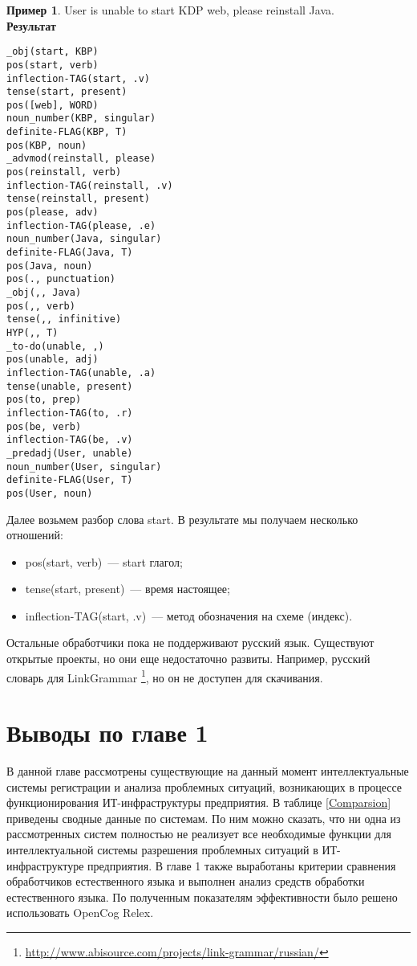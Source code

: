 \textbf{Пример 1}. User is unable to start KDP web, please reinstall Java.\\
\textbf{Результат} 
\begin{lstlisting}
_obj(start, KBP)
pos(start, verb)
inflection-TAG(start, .v)
tense(start, present)
pos([web], WORD)
noun_number(KBP, singular)
definite-FLAG(KBP, T)
pos(KBP, noun)
_advmod(reinstall, please)
pos(reinstall, verb)
inflection-TAG(reinstall, .v)
tense(reinstall, present)
pos(please, adv)
inflection-TAG(please, .e)
noun_number(Java, singular)
definite-FLAG(Java, T)
pos(Java, noun)
pos(., punctuation)
_obj(,, Java)
pos(,, verb)
tense(,, infinitive)
HYP(,, T)
_to-do(unable, ,)
pos(unable, adj)
inflection-TAG(unable, .a)
tense(unable, present)
pos(to, prep)
inflection-TAG(to, .r)
pos(be, verb)
inflection-TAG(be, .v)
_predadj(User, unable)
noun_number(User, singular)
definite-FLAG(User, T)
pos(User, noun)
\end{lstlisting}




Далее возьмем разбор слова start. В результате мы получаем несколько отношений:
\begin{itemize}
	\item pos(start, verb)~--- start глагол;
	\item tense(start, present)~--- время настоящее;
	\item inflection-TAG(start, .v)~--- метод обозначения на схеме (индекс).
\end{itemize} \par
Остальные обработчики пока не поддерживают русский язык. Существуют открытые проекты, но они еще недостаточно развиты. Например, русский словарь для LinkGrammar \footnote{\url{http://www.abisource.com/projects/link-grammar/russian/}}, но он не доступен для скачивания. 




\section{Выводы по главе 1}
В данной главе рассмотрены существующие на данный момент интеллектуальные системы регистрации и анализа проблемных ситуаций, возникающих в процессе функционирования ИТ-инфраструктуры предприятия.
 В таблице \ref{Comparsion} приведены сводные данные по системам. По ним можно сказать, что ни одна из рассмотренных систем полностью не реализует все необходимые функции для интеллектуальной системы разрешения проблемных ситуаций в ИТ-инфраструктуре предприятия. В главе 1 также выработаны критерии сравнения обработчиков естественного языка и выполнен анализ средств обработки естественного языка. По полученным показателям эффективности было решено использовать OpenCog Relex.

